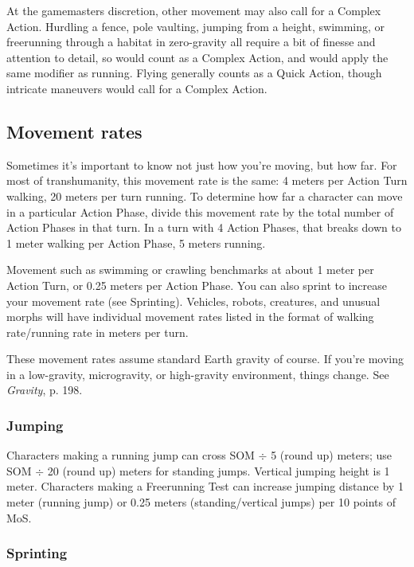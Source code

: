 At the gamemasters discretion, other movement may also call for a Complex Action. Hurdling a fence, pole vaulting, jumping from a height, swimming, or freerunning through a habitat in zero-gravity all require a bit of finesse and attention to detail, so would count as a Complex Action, and would apply the same modifier as running. Flying generally counts as a Quick Action, though intricate maneuvers would call for a Complex Action. 



\subsection{Movement rates} \label{sec:movement-rates} 

Sometimes it’s important to know not just how you’re moving, but how far. For most of transhumanity, this movement rate is the same: 4 meters per Action Turn walking, 20 meters per turn running. To determine how far a character can move in a particular Action Phase, divide this movement rate by the total number of Action Phases in that turn. In a turn with 4 Action Phases, that breaks down to 1 meter walking per Action Phase, 5 meters running. 

Movement such as swimming or crawling benchmarks at about 1 meter per Action Turn, or 0.25 meters per Action Phase. You can also sprint to increase your movement rate (see Sprinting). Vehicles, robots, creatures, and unusual morphs will have individual movement rates listed in the format of walking rate/running rate in meters per turn. 

These movement rates assume standard Earth gravity of course. If you’re moving in a low-gravity, microgravity, or high-gravity environment, things change. See \emph{Gravity}, p. 198. 



\subsubsection{Jumping} 

Characters making a running jump can cross SOM $\div$ 5 (round up) meters; use SOM $\div$ 20 (round up) meters for standing jumps. Vertical jumping height is 1 meter. Characters making a Freerunning Test can increase jumping distance by 1 meter (running jump) or 0.25 meters (standing/vertical jumps) per 10 points of MoS. 

\subsubsection{Sprinting} 

